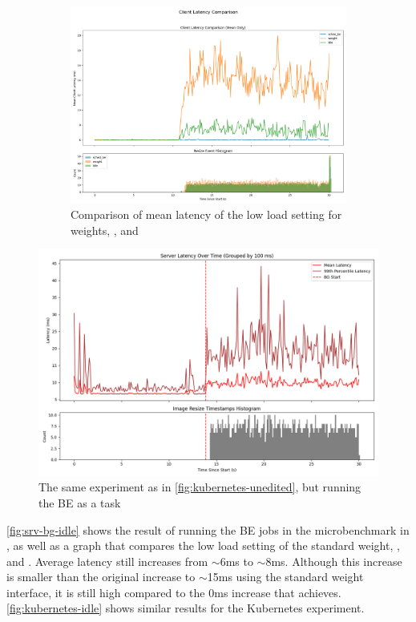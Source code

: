 \begin{figure}[t]
\begin{subfigure}[t]{\columnwidth}
        \includegraphics[width=\columnwidth]{graphs/srv-bg-cmp.png}
        \caption{Comparison of mean latency of the low load setting for weights,
        \schedidle{}, and \schedbe{}}\label{fig:srv-bg-cmp}
    \end{subfigure}
    \vspace{4pt}
    \caption{}\label{fig:srv-bg-idle}
\end{figure}

\begin{figure}[t]
    \centering
    \includegraphics[width=\columnwidth]{graphs/kubernetes-idle.png}
    \caption{The same experiment as in \autoref{fig:kubernetes-unedited}, but
    running the BE as a \schedidle{} task}\label{fig:kubernetes-idle}
\end{figure}

\autoref{fig:srv-bg-idle} shows the result of running the BE jobs in the
microbenchmark in \schedidle{}, as well as a graph that compares the low load
setting of the standard \cgroups{} weight, \schedbe{}, and \schedidle{}. Average
latency still increases from $\sim$6ms to $\sim$8ms. Although this increase is
smaller than the original increase to $\sim$15ms using the standard weight
interface, it is still high compared to the 0ms increase that \schedbe{}
achieves. \autoref{fig:kubernetes-idle} shows similar results for the Kubernetes
experiment.